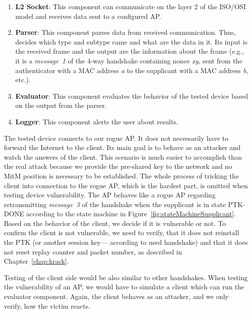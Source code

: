 \begin{enumerate}
\item \textbf{L2 Socket}: This component can communicate on the layer 2 of the ISO/OSI model and receives data sent to a configured AP. 

\item \textbf{Parser}: This component parses data from received communication. Thus, decides which type and subtype came and what are the data in it. Its input is the received frame and the output 
are the information about the frame (e.g., it is a \textit{message~1} of the 4-way handshake containing nonce \textit{xy}, sent from the authenticator with a MAC address \textit{a} to the supplicant with a MAC address \textit{b}, etc.).

\item \textbf{Evaluator}: This component evaluates the behavior of the tested device based on the output from the parser.

\item \textbf{Logger}: This component alerts the user about results. 
\end{enumerate}

The tested device connects to our rogue AP. It does not necessarily have to forward the Internet to the client. Its main goal is to behave as an attacker and watch the answers of the client. This scenario is much easier to accomplish than the real attack because we provide the pre-shared key to the network and no MitM position is necessary to be established. The whole process of tricking the client into connection to the rogue AP, which is the hardest part, is omitted when testing device vulnerability. The AP behaves like a rogue AP regarding retransmitting \textit{message~3} of the handshake when the supplicant is in state PTK-DONE according to the state machine in Figure~\ref{fig:stateMachineSupplicant}. Based on the behavior of the client, we decide if it is vulnerable or not. To confirm the client is not vulnerable, we need to verify, that it does not reinstall the PTK (or another session key--- according to used handshake) and that it does not reset replay counter and packet number, as described in Chapter~\ref{chap:krack}.

Testing of the client side would be also similar to other handshakes. When testing the vulnerability of an AP, we would have to simulate a client which can run the evaluator component. Again, the client behaves as an attacker, and we only verify, how the victim reacts. 

